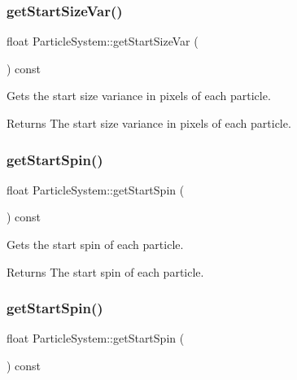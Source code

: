 \subsubsection{\texorpdfstring{get\+Start\+Size\+Var()}{getStartSizeVar()}\hspace{0.1cm}{\footnotesize\ttfamily [2/2]}}
{\footnotesize\ttfamily float Particle\+System\+::get\+Start\+Size\+Var (\begin{DoxyParamCaption}{ }\end{DoxyParamCaption}) const\hspace{0.3cm}{\ttfamily [inline]}}

Gets the start size variance in pixels of each particle.

\begin{DoxyReturn}{Returns}
The start size variance in pixels of each particle. 
\end{DoxyReturn}
\mbox{\label{classParticleSystem_a980f2d469eb4e458a9821b0519781daf}} 
\subsubsection{\texorpdfstring{get\+Start\+Spin()}{getStartSpin()}\hspace{0.1cm}{\footnotesize\ttfamily [1/2]}}
{\footnotesize\ttfamily float Particle\+System\+::get\+Start\+Spin (\begin{DoxyParamCaption}{ }\end{DoxyParamCaption}) const\hspace{0.3cm}{\ttfamily [inline]}}

Gets the start spin of each particle.

\begin{DoxyReturn}{Returns}
The start spin of each particle. 
\end{DoxyReturn}
\mbox{\label{classParticleSystem_a980f2d469eb4e458a9821b0519781daf}} 
\subsubsection{\texorpdfstring{get\+Start\+Spin()}{getStartSpin()}\hspace{0.1cm}{\footnotesize\ttfamily [2/2]}}
{\footnotesize\ttfamily float Particle\+System\+::get\+Start\+Spin (\begin{DoxyParamCaption}{ }\end{DoxyParamCaption}) const\hspace{0.3cm}{\ttfamily [inline]}}

